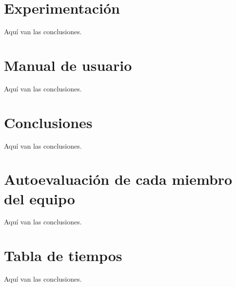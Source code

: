 \documentclass[12pt]{article} %
\begin{document}
\section{Experimentación}
Aquí van las conclusiones.

\section{Manual de usuario}
Aquí van las conclusiones.

\section{Conclusiones}
Aquí van las conclusiones.

\section{Autoevaluación de cada miembro del equipo}
Aquí van las conclusiones.

\section{Tabla de tiempos}
Aquí van las conclusiones.

\printbibliography
\end{document}

